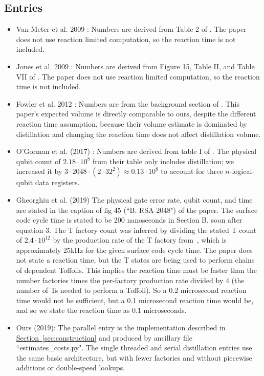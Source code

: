 \documentclass[a4paper, onecolumn, accepted=2021-03-29]{quantumarticle}
\renewcommand{\sec}[1]{\hyperref[sec:#1]{Section~\ref*{sec:#1}}}
\begin{document}
\subsection{Entries}

\begin{itemize}
    \item Van Meter et al. 2009 \cite{van2010distributed}:
        Numbers are derived from Table 2 of \cite{van2010distributed}.
        The paper does not use reaction limited computation, so the reaction time is not included.
    \item Jones et al. 2009 \cite{jones2012layered}:
        Numbers are derived from Figure 15, Table II, and Table VII of \cite{jones2012layered}.
        The paper does not use reaction limited computation, so the reaction time is not included.
    \item Fowler et al. 2012 \cite{fowler2012surfacecodereview}:
        Numbers are from the background section of \cite{fowler2012surfacecodereview}.
        This paper's expected volume is directly comparable to ours, despite the different reaction time assumption, because their volume estimate is dominated by distillation and changing the reaction time does not affect distillation volume.
    \item O'Gorman et al. (2017) \cite{ogorman2017factories}:
        Numbers are derived from table I of \cite{ogorman2017factories}.
        The physical qubit count of $2.18 \cdot 10^8$ from their table only includes distillation; we increased it by $3 \cdot 2048 \cdot (2 \cdot 32^2) \approx 0.13 \cdot 10^8$ to account for three $n$-logical-qubit data registers.
    \item Gheorghiu et al. (2019) \cite{gheorghiu2019cryptanalysis}
        The physical gate error rate, qubit count, and time are stated in the caption of fig 45 (``B. RSA-2048") of the paper.
        The surface code cycle time is stated to be 200 nanoseconds in Section B, soon after equation 3.
        The T factory count was inferred by dividing the stated T count of $2.4 \cdot 10^{12}$ by the production rate of the T factory from~\cite{fowler2018}, which is approximately 25kHz for the given surface code cycle time.
        The paper does not state a reaction time, but the T states are being used to perform chains of dependent Toffolis.
        This implies the reaction time must be faster than the number factories times the per-factory production rate divided by 4 (the number of Ts needed to perform a Toffoli).
        So a 0.2 microsecond reaction time would not be sufficient, but a 0.1 microsecond reaction time would be, and so we state the reaction time as 0.1 microseconds.
        \\
    \item Ours (2019):
        The parallel entry is the implementation described in \sec{construction} and produced by ancillary file ``estimates\_costs.py".
        The single threaded and serial distillation entries use the same basic architecture, but with fewer factories and without piecewise additions or double-speed lookups.
\end{itemize}
\end{document}
